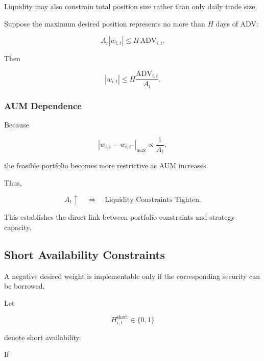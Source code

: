 \documentclass[11pt,a4paper]{article}
\begin{document}
Liquidity may also constrain total position size rather than only daily trade
size.

Suppose the maximum desired position represents no more than $H$ days of ADV:

\begin{equation}
A_t|w_{i,t}|
\leq
H
\,
\mathrm{ADV}_{i,t}.
\end{equation}

Then

\begin{equation}
\boxed{
|w_{i,t}|
\leq
H
\frac{
\mathrm{ADV}_{i,t}
}{
A_t
}.
}
\end{equation}


\subsubsection{AUM Dependence}

Because

\begin{equation}
|w_{i,t}-w_{i,t^-}|_{\max}
\propto
\frac{1}{A_t},
\end{equation}

the feasible portfolio becomes more restrictive as AUM increases.

Thus,

\begin{equation}
\boxed{
A_t\uparrow
\quad\Rightarrow\quad
\text{Liquidity Constraints Tighten}.
}
\end{equation}

This establishes the direct link between portfolio constraints and strategy
capacity.


\subsection{Short Availability Constraints}
\label{subsec:short_availability_constraints}

A negative desired weight is implementable only if the corresponding security
can be borrowed.

Let

\begin{equation}
H_{i,t}^{\mathrm{short}}
\in
\{0,1\}
\end{equation}

denote short availability.

If
\end{document}
